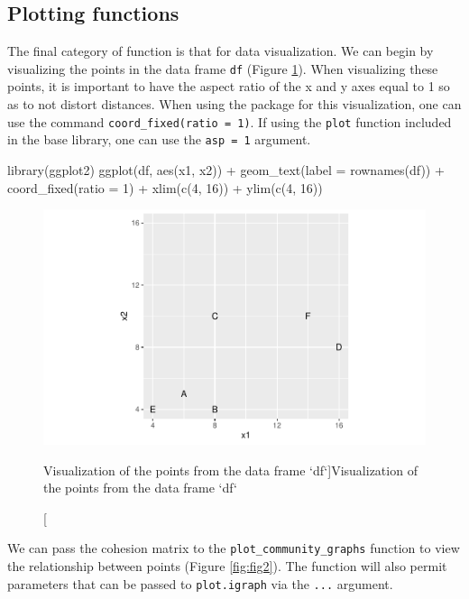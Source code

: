 \hypertarget{plotting-functions}{%
\subsection{Plotting functions}\label{plotting-functions}}

The final category of function is that for data visualization. We can
begin by visualizing the points in the data frame \texttt{df} (Figure
\ref{fig:fig1}). When visualizing these points, it is important to have
the aspect ratio of the x and y axes equal to 1 so as to not distort
distances. When using the  package for this
visualization, one can use the command
\texttt{coord\_fixed(ratio\ =\ 1)}. If using the \texttt{plot} function
included in the base library, one can use the \texttt{asp\ =\ 1}
argument.

\begin{Schunk}
\begin{Sinput}
library(ggplot2)
ggplot(df, aes(x1, x2)) +
  geom_text(label = rownames(df)) + 
  coord_fixed(ratio = 1) + 
  xlim(c(4, 16)) + 
  ylim(c(4, 16))
\end{Sinput}
\begin{figure}
\includegraphics{dagostino-mcgowan_files/figure-latex/fig1-1} \caption[Visualization of the points from the data frame `df`]{Visualization of the points from the data frame `df`}\label{fig:fig1}
\end{figure}
\end{Schunk}

We can pass the cohesion matrix to the \texttt{plot\_community\_graphs}
function to view the relationship between points (Figure
\ref{fig:fig2}). The function will also permit parameters that can be
passed to \texttt{plot.igraph} via the \texttt{...} argument.

